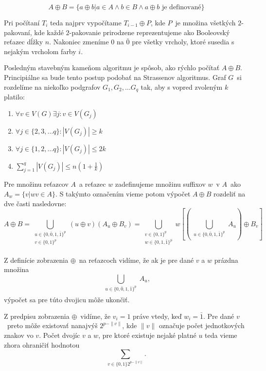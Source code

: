 $$A \oplus B = \{ a \oplus b | a \in A \wedge b \in B \wedge a \oplus b \textrm{ je definované} \} $$

Pri počítaní $T_i$ teda najprv vypočítame $T_{i-1} \oplus P$, kde $P$ je množina všetkých $2$-pakovaní, kde
každé $2$-pakovanie prirodzene reprezentujeme ako Booleovský reťazec dĺžky $n$. Nakoniec zmeníme $0$ na $\bar{0}$ pre
všetky vrcholy, ktoré susedia s nejakým vrcholom farby $i$.

Posledným stavebným kameňom algoritmu je spôsob, ako rýchlo počítať $A \oplus B$. Principiálne
sa bude tento postup podobať na Strassenov algoritmus. Graf $G$ si rozdelíme na niekoľko podgrafov
$G_1, G_2, \ldots G_q$ tak, aby s vopred zvoleným $k$ platilo:

\begin{enumerate}
    \item $\forall v \in V(G) \exists j : v \in V(G_j)$
    \item $\forall j \in \{2, 3, \ldots q \} : |V(G_j)| \ge k$
    \item $\forall j \in \{ 1, 2, \ldots q \} : |V(G_j)| \leq 2k$
    \item $\sum_{j=1}^q |V(G_j)| \leq n(1 + \frac{1}{k})$
\end{enumerate}

Pre množinu reťazcov $A$ a reťazec $w$ zadefinujeme množinu suffixov $w$ v $A$ ako $A_w = \{v | wv \in A\}$.
S takýmto označením vieme potom výpočet $A \oplus B$ rozdeliť na dve časti nasledovne:
$$A \oplus B = \bigcup_{\substack{u \in \{0, \bar{0}, 1, \bar{1}\}^p \\ v \in \{0, 1\}^p \\ [u \oplus v \textrm{ je definované}]} }
(u \oplus v)(A_u \oplus B_v) = \bigcup_{\substack{v \in \{0, 1\}^p \\ w \in \{0, 1, \bar{1}\}^p}}
w \left[ \left( \bigcup_{\substack{u \in \{0, \bar{0}, 1, \bar{1}\}^p \\ [u \oplus v = w] }} A_u \right) \oplus B_v \right]$$

Z definície zobrazenia $\oplus$ na reťazcoch vidíme, že ak je pre dané $v$ a $w$ prázdna množina
$$ \bigcup_{\substack{u \in \{0, \bar{0}, 1, \bar{1}\}^p \\ [u \oplus v = w] }} A_u,$$
výpočet sa pre túto dvojicu môže ukončiť.

Z predpisu zobrazenia $\oplus$ vidíme, že $v_i = 1$ práve vtedy, keď $w_i = \bar{1}$. Pre dané
$v$ preto môže existovať nanajvýš $2^{p - \|v\|}$, kde $\|v\|$ označuje počet jednotkových znakov
vo $v$. Počet dvojíc $v$ a $w$, pre ktoré existuje nejaké platné $u$ teda vieme zhora ohraničiť
hodnotou
$$\sum_{v \in \{0, 1\} 2^{p - \|v\|}}.$$

